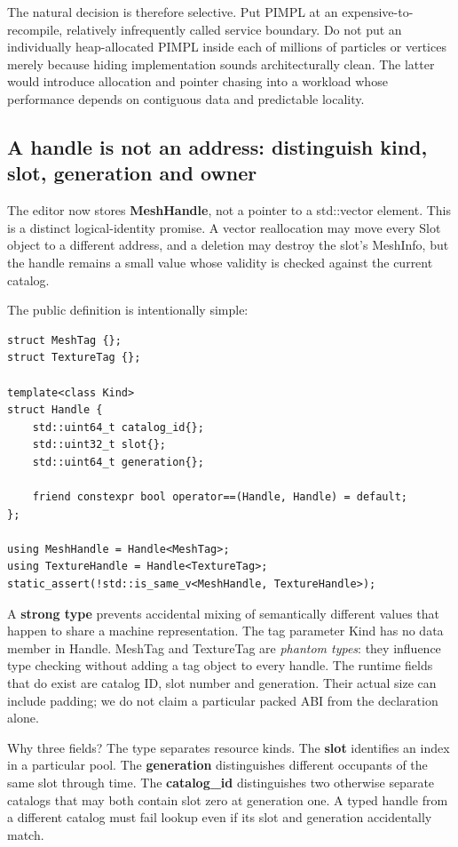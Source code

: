 The natural decision is therefore selective. Put PIMPL at an expensive-to-recompile, relatively infrequently called service boundary. Do not put an individually heap-allocated PIMPL inside each of millions of particles or vertices merely because hiding implementation sounds architecturally clean. The latter would introduce allocation and pointer chasing into a workload whose performance depends on contiguous data and predictable locality.

\subsection{A handle is not an address: distinguish kind, slot, generation and owner}\label{05-engine-i-ch007-a-handle-is-not-an-address-distinguish-kind-slot-generation-and-owner}

The editor now stores \textbf{MeshHandle}, not a pointer to a std::vector element. This is a distinct logical-identity promise. A vector reallocation may move every Slot object to a different address, and a deletion may destroy the slot's MeshInfo, but the handle remains a small value whose validity is checked against the current catalog.

The public definition is intentionally simple:

\begin{verbatim}
struct MeshTag {};
struct TextureTag {};

template<class Kind>
struct Handle {
    std::uint64_t catalog_id{};
    std::uint32_t slot{};
    std::uint64_t generation{};

    friend constexpr bool operator==(Handle, Handle) = default;
};

using MeshHandle = Handle<MeshTag>;
using TextureHandle = Handle<TextureTag>;
static_assert(!std::is_same_v<MeshHandle, TextureHandle>);
\end{verbatim}

A \textbf{strong type} prevents accidental mixing of semantically different values that happen to share a machine representation. The tag parameter Kind has no data member in Handle. MeshTag and TextureTag are \emph{phantom types}: they influence type checking without adding a tag object to every handle. The runtime fields that do exist are catalog ID, slot number and generation. Their actual size can include padding; we do not claim a particular packed ABI from the declaration alone.

Why three fields? The type separates resource kinds. The \textbf{slot} identifies an index in a particular pool. The \textbf{generation} distinguishes different occupants of the same slot through time. The \textbf{catalog\_id} distinguishes two otherwise separate catalogs that may both contain slot zero at generation one. A typed handle from a different catalog must fail lookup even if its slot and generation accidentally match.

